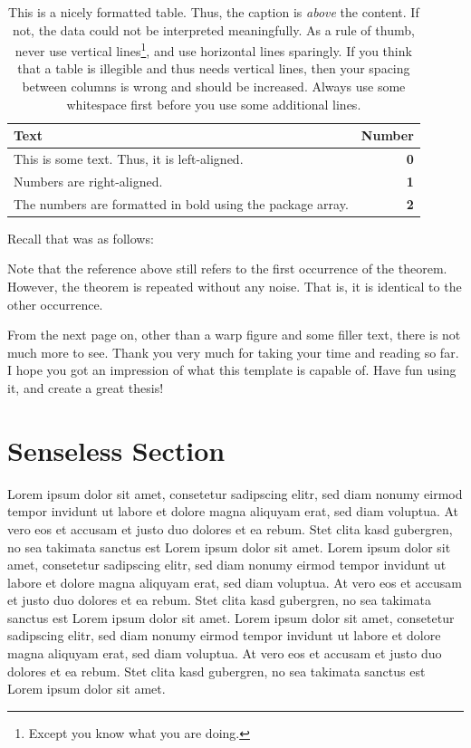 \begin{table}[t]
    \centering
    \caption{This is a nicely formatted table. Thus, the caption is \emph{above} the content. If not, the data could not be interpreted meaningfully. As a rule of thumb, never use vertical lines\footnote[0][-0.2]{Except you know what you are doing.}, and use horizontal lines sparingly. If you think that a table is illegible and thus needs vertical lines, then your spacing between columns is wrong and should be increased. Always use some whitespace first before you use some additional lines.}
    \label{tab:textAndNumbers}
    \begin{tabular}{p{}>{\bfseries}r}
        \toprule
        Text                                                                & Number\\\midrule
        This is some text. Thus, it is left-aligned.                        & 0\\
        Numbers are right-aligned.                                          & 1\\
        The numbers are formatted in bold using the package \textsf{array}. & 2\\\bottomrule
    \end{tabular}
\end{table}

Recall that  was as follows:

\variableDrift*

Note that the reference above still refers to the first occurrence of the theorem. However, the theorem is repeated without any noise. That is, it is identical to the other occurrence.

From the next page on, other than a warp figure and some filler text, there is not much more to see. Thank you very much for taking your time and reading so far. I hope you got an impression of what this template is capable of. Have fun using it, and create a great thesis!

\section{Senseless Section}

Lorem ipsum dolor sit amet, consetetur sadipscing elitr, sed diam nonumy eirmod tempor invidunt ut labore et dolore magna aliquyam erat, sed diam voluptua. At vero eos et accusam et justo duo dolores et ea rebum. Stet clita kasd gubergren, no sea takimata sanctus est Lorem ipsum dolor sit amet. Lorem ipsum dolor sit amet, consetetur sadipscing elitr, sed diam nonumy eirmod tempor invidunt ut labore et dolore magna aliquyam erat, sed diam voluptua. At vero eos et accusam et justo duo dolores et ea rebum. Stet clita kasd gubergren, no sea takimata sanctus est Lorem ipsum dolor sit amet. Lorem ipsum dolor sit amet, consetetur sadipscing elitr, sed diam nonumy eirmod tempor invidunt ut labore et dolore magna aliquyam erat, sed diam voluptua. At vero eos et accusam et justo duo dolores et ea rebum. Stet clita kasd gubergren, no sea takimata sanctus est Lorem ipsum dolor sit amet.

